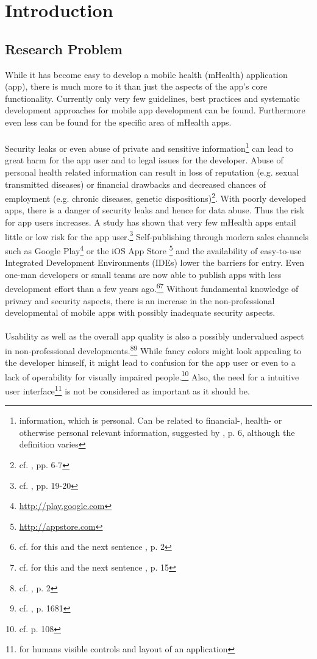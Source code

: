 \section{Introduction}
\subsection{Research Problem}
While it has become easy to develop a mobile health (mHealth) application (app), there is much more to it than just the aspects of the app's core functionality. Currently only very few guidelines, best practices and systematic development approaches for mobile app development can be found. Furthermore even less can be found for the specific area of mHealth apps.
\\
\\
Security leaks or even abuse of private and sensitive information\footnote{information, which is personal. Can be related to financial-, health- or otherwise personal relevant information, suggested by \cite{FutureofPrivacyForumCenterforDemocracy&Technology.2011}, p. 6, although the definition varies} can lead to great harm for the app user and to legal issues for the developer. Abuse of personal health related information can result in loss of reputation (e.g. sexual transmitted diseases) or financial drawbacks and decreased chances of employment (e.g. chronic diseases, genetic dispositions)\footnote{cf. \cite{Dehling.2013}, pp. 6-7}. With poorly developed apps, there is a danger of security leaks and hence for data abuse. Thus the risk for app users increases. A study has shown that very few mHealth apps entail little or low risk for the app user.\footnote{cf. \cite{Njie.2013}, pp. 19-20} Self-publishing through modern sales channels such as Google Play\footnote{\url{http://play.google.com}} or the iOS App Store \footnote{\url{http://appstore.com}} and the availability of easy-to-use Integrated Development Environments (IDEs) lower the barriers for entry. Even one-man developers or small teams are now able to publish apps with less development effort than a few years ago.\footnote{cf. for this and the next sentence \cite{Dehling.2013}, p. 2}\footnote{cf. for this and the next sentence \cite{Moore.2012}, p. 15} Without fundamental knowledge of privacy and security aspects, there is an increase in the non-professional developmental of mobile apps with possibly inadequate security aspects.
\\
\\
Usability as well as the overall app quality is also a possibly undervalued aspect in non-professional developments.\footnote{cf. \cite{Dehling.2013}, p. 2}\footnote{cf. \cite{Mayer.2012}, p. 1681} While fancy colors might look appealing to the developer himself, it might lead to confusion for the app user or even to a lack of operability for visually impaired people.\footnote{cf. \cite{Badashian.2008} p. 108} Also, the need for a intuitive user interface\footnote{for humans visible controls and layout of an application} is not be considered as important as it should be.
